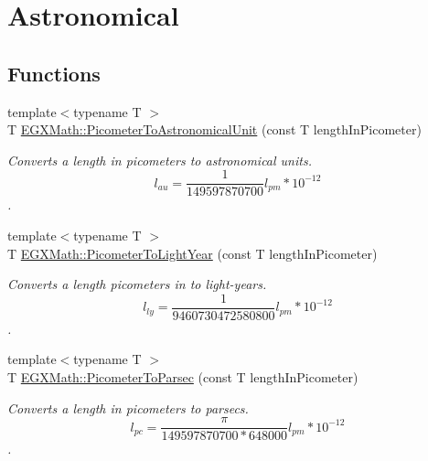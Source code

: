 \hypertarget{group___e_g_x_math-_conversions-_length_conversions-_picometer-_astronomical}{}\section{Astronomical}
\label{group___e_g_x_math-_conversions-_length_conversions-_picometer-_astronomical}
\subsection*{Functions}
\begin{DoxyCompactItemize}
\item 
{\footnotesize template$<$typename T $>$ }\\T \mbox{\hyperlink{group___e_g_x_math-_conversions-_length_conversions-_picometer-_astronomical_gae051f7eb0eb85b99c614183acc6b8ea6}{E\+G\+X\+Math\+::\+Picometer\+To\+Astronomical\+Unit}} (const T length\+In\+Picometer)
\begin{DoxyCompactList}\small\item\em Converts a length in picometers to astronomical units. \[ l_{au}= \frac{1}{149597870700} l_{pm} * 10^{-12} \]. \end{DoxyCompactList}\item 
{\footnotesize template$<$typename T $>$ }\\T \mbox{\hyperlink{group___e_g_x_math-_conversions-_length_conversions-_picometer-_astronomical_ga4d8abbec265ae9e35ac109356db5b89a}{E\+G\+X\+Math\+::\+Picometer\+To\+Light\+Year}} (const T length\+In\+Picometer)
\begin{DoxyCompactList}\small\item\em Converts a length picometers in to light-\/years. \[ l_{ly}= \frac{1}{9460730472580800} l_{pm} * 10^{-12} \]. \end{DoxyCompactList}\item 
{\footnotesize template$<$typename T $>$ }\\T \mbox{\hyperlink{group___e_g_x_math-_conversions-_length_conversions-_picometer-_astronomical_ga3248f6de04d23f6568866a8cd80188b6}{E\+G\+X\+Math\+::\+Picometer\+To\+Parsec}} (const T length\+In\+Picometer)
\begin{DoxyCompactList}\small\item\em Converts a length in picometers to parsecs. \[ l_{pc}=\frac{\pi}{149597870700 * 648000} l_{pm} * 10^{-12} \]. \end{DoxyCompactList}\end{DoxyCompactItemize}


